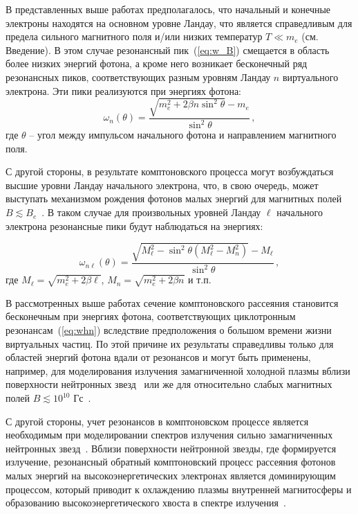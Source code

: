 В представленных выше работах предполагалось, что начальный и конечные электроны находятся 
на основном уровне Ландау, что является справедливым для предела сильного магнитного поля 
и/или низких температур $T\ll m_e$ (см. Введение). В этом случае резонансный 
пик~(\ref{eq:w_B})  смещается в область более низких энергий фотона, а кроме 
него возникает бесконечный ряд резонансных пиков, соответствующих разным 
уровням Ландау $n$ 
виртуального электрона. Эти пики реализуются при энергиях фотона:
\begin{equation}\label{eq:whn}
	\omega_n(\theta)= \frac{\sqrt{m_e^2+2 \beta n \sin^2\theta} - 
		m_e}{\sin^2\theta}\, ,
\end{equation}
где $\theta$ -- угол между импульсом начального фотона и направлением 
магнитного поля. 

С другой стороны, в результате комптоновского процесса могут возбуждаться 
высшие уровни Ландау начального электрона, что, в свою очередь, может выступать 
механизмом рождения фотонов малых энергий для магнитных полей $B\lesssim 
B_e$~\cite{Daugherty:1986,Bussard:1986}. В таком случае для произвольных уровней Ландау $\ell$ начального электрона резонансные 
пики будут наблюдаться на энергиях:

\begin{equation}\label{eq:resAll}
	\omega_{n\ell}(\theta)=\frac{\sqrt{M_\ell^2 - \sin^2\theta (M_\ell^2-M_n^2)}-M_\ell}{\sin^2\theta}\, ,
\end{equation}
где $M_\ell=\sqrt{m_e^2+2\beta \ell}$, $M_n=\sqrt{m_e^2+2\beta n}$ и т.п.

В рассмотренных выше работах сечение комптоновского рассеяния 
становится бесконечным при энергиях фотона, соответствующих циклотронным 
резонансам~(\ref{eq:whn}) вследствие предположения о 
большом времени жизни виртуальных частиц. По этой причине их результаты 
справедливы только для областей энергий фотона вдали от резонансов
и могут быть применены, например, для моделирования излучения 
замагниченной 
	холодной плазмы вблизи поверхности нейтронных 
	звезд~\cite{Ozel:2001} или же для относительно слабых магнитных 
	полей $B\lesssim 10^{10}$ Гс~\cite{Zavlin:1996}.

С другой стороны, учет резонансов в комптоновском процессе является необходимым 
при моделировании спектров излучения сильно замагниченных нейтронных 
звезд~\cite{Alexander:1991,Araya:1999,Ho:2001,Lyutikov:2006,Potekhin:2004,Schonherr:2007,Nishimura:2008,Suleimanov:2009}.
Вблизи поверхности нейтронной звезды, где формируется излучение, резонансный 
обратный комптоновский процесс рассеяния фотонов малых энергий на высокоэнергетических электронах 
является доминирующим процессом, который приводит к охлаждению плазмы 
внутренней магнитосферы и образованию высокоэнергетического хвоста в спектре 
излучения~\cite{Fernandez:2007,Nobili:2008,Baring:2018,Beloborodov:2013}.
%

